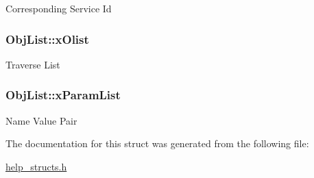 Corresponding Service Id \hypertarget{structObjList_afc09cd5ee68143c7785a56e4915b42a1}{
\subsubsection[{x\-Olist}]{ Obj\-List\-::x\-Olist}}\label{structObjList_afc09cd5ee68143c7785a56e4915b42a1}
Traverse List \hypertarget{structObjList_a9de5f33293ccef1f9fc9b9ef3bf1c358}{
\subsubsection[{x\-Param\-List}]{ Obj\-List\-::x\-Param\-List}}\label{structObjList_a9de5f33293ccef1f9fc9b9ef3bf1c358}
Name Value Pair 

The documentation for this struct was generated from the following file\-:\begin{DoxyCompactItemize}
\item 
\hyperlink{help__structs_8h}{help\-\_\-structs.\-h}\end{DoxyCompactItemize}
